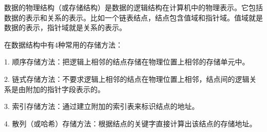 {数据的物理结构（或存储结构）是数据的逻辑结构在计算机中的物理表示。它包括}{数据的表示和关系的表示。比如一个链表结点，结点包含值域和指针域。值域就是}{数据的表示，指针域就是关系的表示。}

在数据结构中有4种常用的存储方法：

1. {顺序存储方法：}把逻辑上相邻的结点存储在物理位置上相邻的存储单元中。

{2.
{链式存储方法：}不要求逻辑上相邻的结点在物理位置上相邻，结点间的逻辑关系是由附加的指针字段表示的。}

{3. {索引存储方法：}通过建立附加的索引表来标识结点的地址。}

{4.
{散列（或哈希）存储方法：}根据结点的关键字直接计算出该结点的存储地址。}

